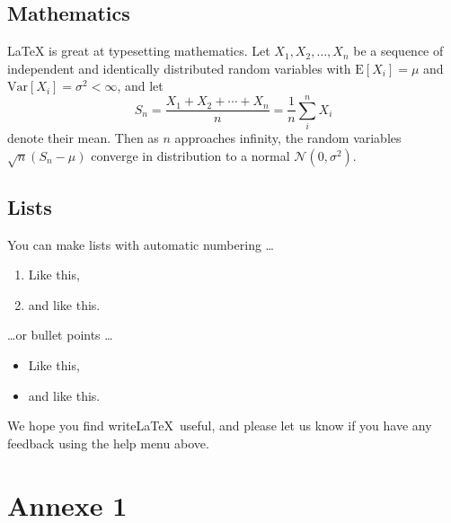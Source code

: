 \subsection{Mathematics}

\LaTeX{} is great at typesetting mathematics. Let $X_1, X_2, \ldots, X_n$ be a sequence of independent and identically distributed random variables with $\text{E}[X_i] = \mu$ and $\text{Var}[X_i] = \sigma^2 < \infty$, and let
$$S_n = \frac{X_1 + X_2 + \cdots + X_n}{n}
      = \frac{1}{n}\sum_{i}^{n} X_i$$
denote their mean. Then as $n$ approaches infinity, the random variables $\sqrt{n}(S_n - \mu)$ converge in distribution to a normal $\mathcal{N}(0, \sigma^2)$.

\subsection{Lists}

You can make lists with automatic numbering \dots

\begin{enumerate}
\item Like this,
\item and like this.
\end{enumerate}
\dots or bullet points \dots
\begin{itemize}
\item Like this,
\item and like this.
\end{itemize}

We hope you find write\LaTeX\ useful, and please let us know if you have any feedback using the help menu above.

\appendix
\section{Annexe 1}
\label{sec:Annexe 1}



